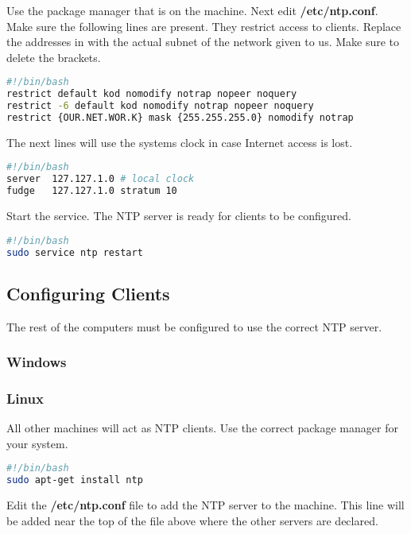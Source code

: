 \documentclass{article}
\begin{document}
Use the package manager that is on the machine. Next edit \textbf{/etc/ntp.conf}. Make sure the following lines are present. They restrict access to clients. Replace the addresses in {} with the actual subnet of the network given to us. Make sure to delete the brackets.

\begin{lstlisting}[language=bash]
#!/bin/bash
restrict default kod nomodify notrap nopeer noquery
restrict -6 default kod nomodify notrap nopeer noquery
restrict {OUR.NET.WOR.K} mask {255.255.255.0} nomodify notrap
\end{lstlisting}

The next lines will use the systems clock in case Internet access is lost.

\begin{lstlisting}[language=bash]
#!/bin/bash
server  127.127.1.0 # local clock
fudge   127.127.1.0 stratum 10
\end{lstlisting}

Start the service. The NTP server is ready for clients to be configured.

\begin{lstlisting}[language=bash]
#!/bin/bash
sudo service ntp restart
\end{lstlisting}


\subsection{Configuring Clients}
The rest of the computers must be configured to use the correct NTP server.

\subsubsection{Windows}


\subsubsection{Linux}
All other machines will act as NTP clients. Use the correct package manager for your system.

\begin{lstlisting}[language=bash]
#!/bin/bash
sudo apt-get install ntp
\end{lstlisting}

Edit the \textbf{/etc/ntp.conf} file to add the NTP server to the machine. This line will be added near the top of the file above where the other servers are declared.
\end{document}
